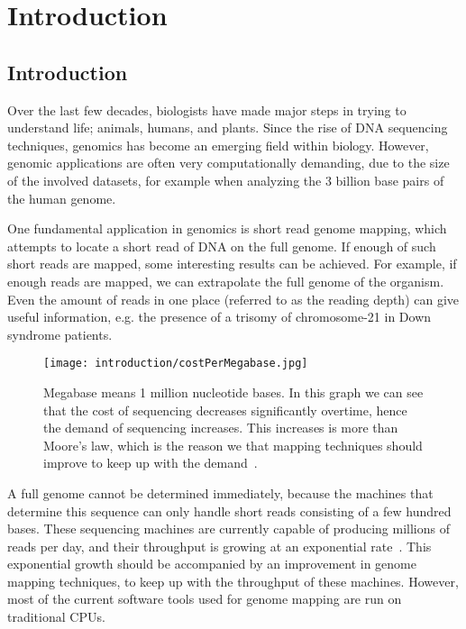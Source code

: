 
\chapter{Introduction}

\section{Introduction}
Over the last few decades, biologists have made major steps in trying to understand life; animals, humans, and plants. Since the rise of DNA sequencing techniques, genomics has become an emerging field within biology. However, genomic applications are often very computationally demanding, due to the size of the involved datasets, for example when analyzing the 3 billion base pairs of the human genome.

One fundamental application in genomics is short read genome mapping, which attempts to locate a short read of DNA on the full genome. If enough of such short reads are mapped, some interesting results can be achieved. For example, if enough reads are mapped, we can extrapolate the full genome of the organism. Even the amount of reads in one place (referred to as the reading depth) can give useful information, e.g. the presence of a trisomy of chromosome-21 in Down syndrome patients.

\begin{figure}[H]
	\centering
	\texttt{[image: introduction/costPerMegabase.jpg]}
	\caption{Megabase means 1 million nucleotide bases. In this graph we can see that the cost of sequencing decreases significantly overtime, hence the demand of sequencing increases. This increases is more than Moore's law, which is the reason we that mapping techniques should improve to keep up with the demand~\cite{SeqCost}.}
	\label{fig:costMb}
\end{figure}

A full genome cannot be determined immediately, because the machines that determine this sequence can only handle short reads consisting of a few hundred bases. These sequencing machines are currently capable of producing millions of reads per day, and their throughput is growing at an exponential rate~\cite{SeqCost}. This exponential growth should be accompanied by an improvement in genome mapping techniques, to keep up with the throughput of these machines. However, most of the current software tools used for genome mapping are run on traditional CPUs. 

